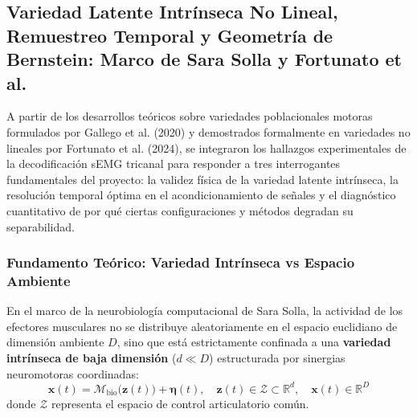 \documentclass[11pt,a4paper]{article}
\begin{document}
\subsection{Variedad Latente Intrínseca No Lineal, Remuestreo Temporal y Geometría de Bernstein: Marco de Sara Solla y Fortunato et al.}
\label{subsec:variedad_intrinseca_solla_resolucion}

A partir de los desarrollos teóricos sobre variedades poblacionales motoras formulados por Gallego et al. (2020) y demostrados formalmente en variedades no lineales por Fortunato et al. (2024), se integraron los hallazgos experimentales de la decodificación sEMG tricanal para responder a tres interrogantes fundamentales del proyecto: la validez física de la variedad latente intrínseca, la resolución temporal óptima en el acondicionamiento de señales y el diagnóstico cuantitativo de por qué ciertas configuraciones y métodos degradan su separabilidad.

\subsubsection{Fundamento Teórico: Variedad Intrínseca vs Espacio Ambiente}
\label{subsubsec:fundamento_variedad_solla}

En el marco de la neurobiología computacional de Sara Solla, la actividad de los efectores musculares no se distribuye aleatoriamente en el espacio euclidiano de dimensión ambiente $D$, sino que está estrictamente confinada a una \textbf{variedad intrínseca de baja dimensión} ($d \ll D$) estructurada por sinergias neuromotoras coordinadas:
\begin{equation}
    \mathbf{x}(t) = \mathcal{M}_{\text{bio}}\big(\mathbf{z}(t)\big) + \boldsymbol{\eta}(t), \quad \mathbf{z}(t) \in \mathcal{Z} \subset \mathbb{R}^d, \quad \mathbf{x}(t) \in \mathbb{R}^D
\end{equation}
donde $\mathcal{Z}$ representa el espacio de control articulatorio común.
\end{document}

